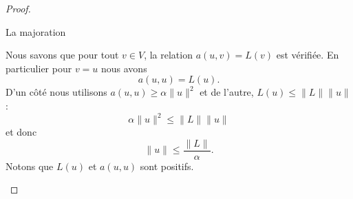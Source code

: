 \begin{proof}
\begin{subproof}
            \item[La majoration]

                Nous savons que pour tout \( v\in V\), la relation \( a(u,v)=L(v)\) est vérifiée. En particulier pour \( v=u\) nous avons
                \begin{equation}
                    a(u,u)=L(u).
                \end{equation}
                D'un côté nous utilisons \( a(u,u)\geq \alpha\| u \|^2\) et de l'autre, \( L(u)\leq \| L \|\| u \|\) :
                \begin{equation}
                    \alpha\| u \|^2\leq \| L \|\| u \|
                \end{equation}
                et donc
                \begin{equation}
                    \| u \|\leq \frac{ \| L \| }{ \alpha }.
                \end{equation}
                Notons que \( L(u)\) et \( a(u,u)\) sont positifs.
    \end{subproof}
\end{proof}

